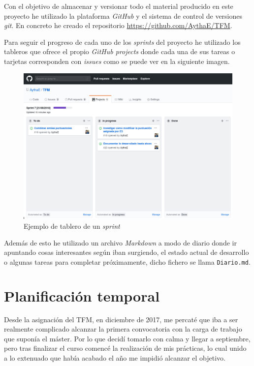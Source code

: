 Con el objetivo de almacenar y versionar todo el material producido en este proyecto he utilizado la plataforma \textit{GitHub} y el sistema de control de versiones \textit{git}. En concreto he creado el repositorio \url{https://github.com/AythaE/TFM}.

Para seguir el progreso de cada uno de los \textit{sprints} del proyecto he utilizado los tableros que ofrece el propio \textit{GitHub projects} donde cada una de sus tareas o tarjetas corresponden con \textit{issues} como se puede ver en la siguiente imagen. 

\begin{figure}[h]
	
	\centering
	\includegraphics[width=\linewidth]{imagenes/ejemplo_tablero_sprint}
	\caption{Ejemplo de tablero de un \textit{sprint}}
	\label{fig:tableroSprint}
\end{figure}

Además de esto he utilizado un archivo \textit{Markdown} a modo de diario donde ir apuntando cosas interesantes según iban surgiendo, el estado actual de desarrollo o algunas tareas para completar próximamente, dicho fichero se llama \texttt{Diario.md}.

\section{Planificación temporal}

Desde la asignación del \acrshort{TFM}, en diciembre de 2017, me percaté que iba a ser realmente complicado alcanzar la primera convocatoria con la carga de trabajo que suponía el máster. Por lo que decidí tomarlo con calma y llegar a septiembre, pero tras finalizar el curso comencé la realización de mis prácticas, lo cual unido a lo extenuado que había acabado el año me impidió alcanzar el objetivo. 

